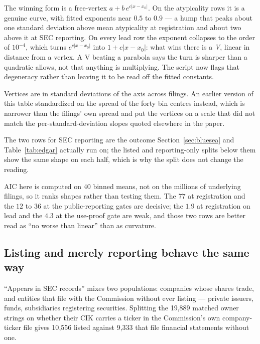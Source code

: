\documentclass[11pt]{article}
\begin{document}
\noindent The winning form is a free-vertex $a + b\,e^{c|x-x_0|}$. On the
atypicality rows it is a genuine curve, with fitted exponents near $0.5$ to
$0.9$ --- a hump that peaks about one standard deviation above mean
atypicality at registration and about two above it at SEC reporting. On every
lead row the exponent collapses to the order of $10^{-4}$, which turns
$e^{c|x-x_0|}$ into $1 + c|x-x_0|$: what wins there is a \emph{V}, linear in
distance from a vertex. A V beating a parabola says the turn is sharper than a
quadratic allows, not that anything is multiplying. The script now flags that
degeneracy rather than leaving it to be read off the fitted constants.

Vertices are in standard deviations of the axis across filings. An earlier
version of this table standardized on the spread of the forty bin centres
instead, which is narrower than the filings' own spread and put the vertices
on a scale that did not match the per-standard-deviation slopes quoted
elsewhere in the paper.

The two rows for SEC reporting are the outcome Section~\ref{sec:bluesea} and
Table~\ref{tab:edgar} actually run on; the listed and reporting-only splits
below them show the same shape on each half, which is why the split does not
change the reading.

AIC here is computed on 40 binned means, not on the millions of underlying
filings, so it ranks shapes rather than testing them. The $77$ at registration
and the $12$ to $36$ at the public-reporting gates are decisive; the $1.9$ at
registration on lead and the $4.3$ at the use-proof gate are weak, and those
two rows are better read as ``no worse than linear'' than as curvature.

\subsection{Listing and merely reporting behave the same way}

``Appears in SEC records'' mixes two populations: companies whose shares trade, and entities that file with
the Commission without ever listing --- private issuers, funds, subsidiaries
registering securities. Splitting the 19{,}889 matched owner strings on whether
their CIK carries a ticker in the Commission's own company-ticker file gives
10{,}556 listed against 9{,}333 that file financial statements without one.
\end{document}
